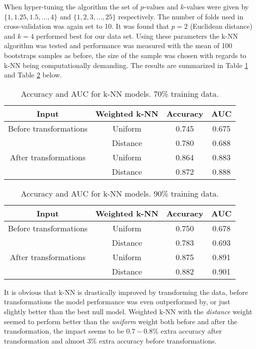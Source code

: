 \documentclass[../../project.tex]{subfiles}
\begin{document}
	When hyper-tuning the algorithm the set of $p$-values and $k$-values were given by $\{1,1.25,1.5,...,4\}$ and $\{1,2,3,...,25\}$ respectively. The number of folds used in cross-validation was again set to 10. It was found that $p = 2$ (Euclidean distance) and $k = 4$ performed best for our data set. Using these parameters the k-NN algorithm was tested and performance was measured with the mean of 100 bootstraps samples as before, the size of the sample was chosen with regards to k-NN being computationally demanding. The results are summarized in Table \ref{tab:k_nn_table_10} and Table \ref{tab:k_nn_table_20} below.
	
	
	\begin{table}[!h]
		\centering
		\begin{tabular}{cccc}
			Input & Weighted k-NN & Accuracy & AUC \\
			\midrule
			Before transformations & Uniform & 0.745 & 0.675 \\
			& Distance & 0.780 & 0.688 \\
			\midrule
			After transformations & Uniform & 0.864 & 0.883 \\
			& Distance & 0.872 & 0.888 \\
		\end{tabular}
		\caption{Accuracy and AUC for k-NN models. 70\% training data.}
		\label{tab:k_nn_table_10}
	\end{table}
	
	
	\begin{table}[!h]
		\centering
		\begin{tabular}{cccc}
			Input & Weighted k-NN & Accuracy & AUC \\
			\midrule
			Before transformations & Uniform & 0.750 & 0.678 \\
			& Distance & 0.783 & 0.693 \\
			\midrule
			After transformations & Uniform & 0.875 & 0.891 \\
			& Distance & 0.882 & 0.901 \\
		\end{tabular}
		\caption{Accuracy and AUC for k-NN models. 90\% training data.}
		\label{tab:k_nn_table_20}
	\end{table}
	
	It is obvious that k-NN is drastically improved by transforming the data, before transformations the model performance was even outperformed by, or just slightly better than the best null model. Weighted k-NN with the \textit{distance} weight seemed to perform better than the \textit{uniform} weight both before and after the transformation, the impact seems to be $0.7-0.8\%$ extra accuracy after transformation and almost $3\%$ extra accuracy before transformations. 
\end{document}
